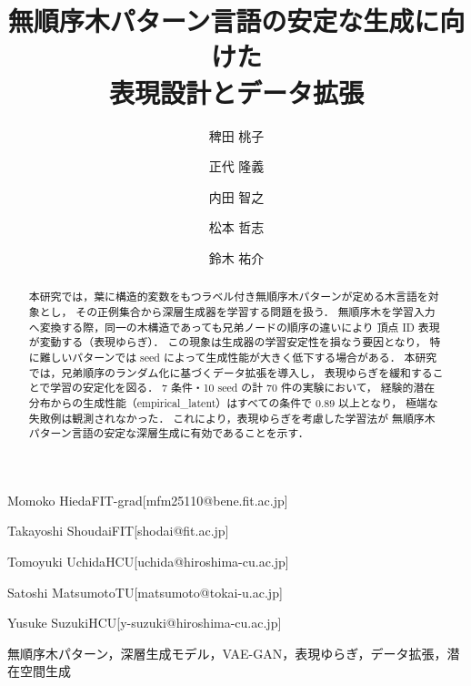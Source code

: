 \documentclass[submit,techrep,noauthor]{ipsj}
\begin{document}
\title{無順序木パターン言語の安定な生成に向けた\\表現設計とデータ拡張}





\author{稗田 桃子}{Momoko Hieda}{FIT-grad}[mfm25110@bene.fit.ac.jp]
\author{正代 隆義}{Takayoshi Shoudai}{FIT}[shodai@fit.ac.jp]
\author{内田 智之}{Tomoyuki Uchida}{HCU}[uchida@hiroshima-cu.ac.jp]
\author{松本 哲志}{Satoshi Matsumoto}{TU}[matsumoto@tokai-u.ac.jp]
\author{鈴木 祐介}{Yusuke Suzuki}{HCU}[y-suzuki@hiroshima-cu.ac.jp]

\begin{abstract}
本研究では，葉に構造的変数をもつラベル付き無順序木パターンが定める木言語を対象とし，
その正例集合から深層生成器を学習する問題を扱う．
無順序木を学習入力へ変換する際，同一の木構造であっても兄弟ノードの順序の違いにより
頂点 ID 表現が変動する（表現ゆらぎ）．
この現象は生成器の学習安定性を損なう要因となり，
特に難しいパターンでは seed によって生成性能が大きく低下する場合がある．
本研究では，兄弟順序のランダム化に基づくデータ拡張を導入し，
表現ゆらぎを緩和することで学習の安定化を図る．
7 条件・10 seed の計 70 件の実験において，
経験的潜在分布からの生成性能（empirical\_latent）はすべての条件で 0.89 以上となり，
極端な失敗例は観測されなかった．
これにより，表現ゆらぎを考慮した学習法が
無順序木パターン言語の安定な深層生成に有効であることを示す．
\end{abstract}

\begin{jkeyword}
無順序木パターン，深層生成モデル，VAE-GAN，表現ゆらぎ，データ拡張，潜在空間生成
\end{jkeyword}
\end{document}
